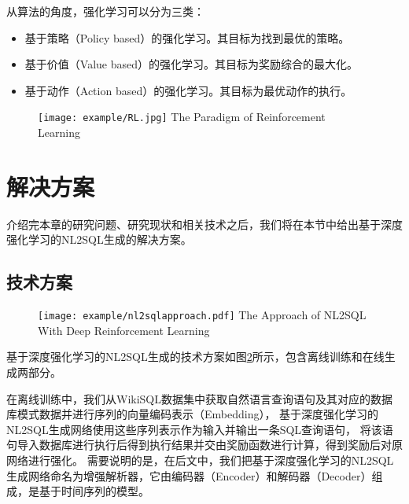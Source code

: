从算法的角度，强化学习可以分为三类：
\begin{itemize}
  \item 基于策略（Policy based）的强化学习。其目标为找到最优的策略。
  \item 基于价值（Value based）的强化学习。其目标为奖励综合的最大化。
  \item 基于动作（Action based）的强化学习。其目标为最优动作的执行。
\end{itemize}
\begin{figure}[!htp]
  \centering
  \texttt{[image: example/RL.jpg]}
    {The Paradigm of Reinforcement Learning}
  \label{fig:RL}
\end{figure}



\section{解决方案}

介绍完本章的研究问题、研究现状和相关技术之后，我们将在本节中给出基于深度强化学习的NL2SQL生成的解决方案。

\subsection{技术方案}
\begin{figure}[!htp]
  \centering
  \texttt{[image: example/nl2sqlapproach.pdf]}
    {The Approach of NL2SQL With Deep Reinforcement Learning}
  \label{fig:nl2sqlapproach}
\end{figure}

基于深度强化学习的NL2SQL生成的技术方案如图\ref{fig:nl2sqlapproach}所示，包含离线训练和在线生成两部分。

在离线训练中，我们从WikiSQL数据集中获取自然语言查询语句及其对应的数据库模式数据并进行序列的向量编码表示（Embedding），
基于深度强化学习的NL2SQL生成网络使用这些序列表示作为输入并输出一条SQL查询语句，
将该语句导入数据库进行执行后得到执行结果并交由奖励函数进行计算，得到奖励后对原网络进行强化。
需要说明的是，在后文中，我们把基于深度强化学习的NL2SQL生成网络命名为增强解析器，它由编码器（Encoder）和解码器（Decoder）组成，是基于时间序列的模型。

